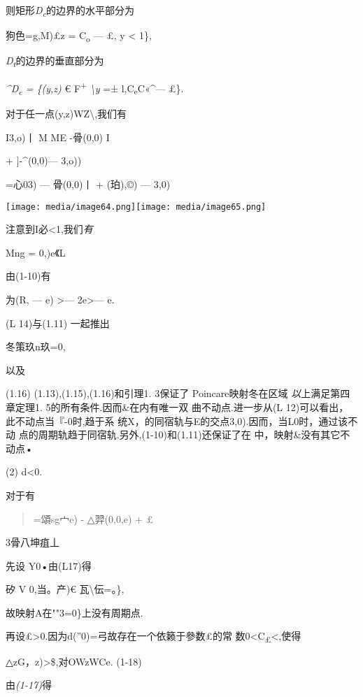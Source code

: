\documentclass{article}
\begin{document}
则矩形\emph{D\textsubscript{c}}的边界的水平部分为

狗色=g,M)£\textbar{}z = C\textsubscript{o} --- £, \textbar{}y\textbar{}
\textless{} 1\},

\emph{D\textsubscript{t}}的边界的垂直部分为

\emph{\^{}D\textsubscript{e} = \{(y,z)} € F\textsuperscript{+}
\emph{\textbackslash{}y} =± l,C\textsubscript{e}C«\^{}--- £\}.

对于任一点(y,z)WZ\textbackslash{},我们有

I3,o)丨 M ME -骨(0,0) I

+ {]}-\^{}(0,0)--- 3,o))

=心03) --- 骨(0,0)丨 + \textbar{}(珀),©) --- 3,0)\textbar{}

\texttt{[image: media/image64.png]}\texttt{[image: media/image65.png]}

注意到I必\textbar{}\textless{}1,我们\emph{有}

Mng = 0,)e《L

由(1-10)有

为(R, --- e) \textgreater{}--- 2e\textgreater{}--- e.

(L 14)与(1.11) 一起推出

冬策玖n玖=0,

以及

(1.16) (1.13),(1.15),(1.16)和引理1. 3保证了 Poincare映射冬在区域
\emph{以}上满足第四章定理1. 5的所有条件.因而\&在内有唯一双
曲不动点.进一步从(L 12)可以看出，此不动点当『-0时,趋于系
统X，的同宿轨与E的交点3,0).因而，当L0时，通过该不动
点的周期轨趋于同宿轨.另外,(1-10)和(1.11)还保证了在
中，映射\&没有其它不动点•

(2) d\textless{}0.

对于有

\begin{quote}
=頌sg宀e) - △羿(0,0,e) + £
\end{quote}

3骨八坤疽丄

先设 Y0•由(L17)得

矽 V 0,当。产)€ 瓦\textbackslash{}伝=。\},

故映射A在""3=0\}上没有周期点.

再设£\textgreater{}0.因为d(''0)=弓故存在一个依籁于參数£的常
数0\textless{}C\textsubscript{£}\textless{}\textbar{},使得

△zG，z)\textgreater{}\$,对OWzWCe. (1-18)

由\emph{(1-17)}得
\end{document}
